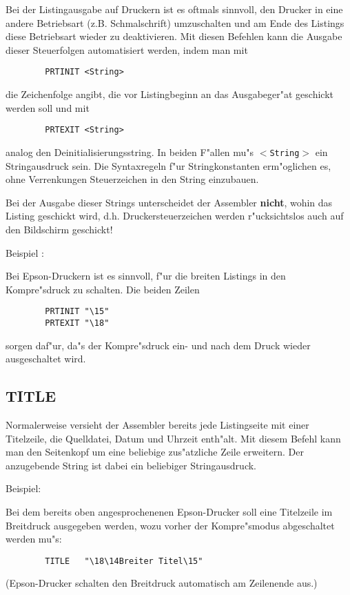 \documentclass[12pt,a4paper,twoside]{report}
\makeatletter
\newcommand{\bb}[1]{{\bf #1}}
\newcommand{\tty}[1]{{\tt #1}}
\newcommand{\ttindex}[1]{\index{#1@{\tt #1}}}
\makeatother
\begin{document}
{Bei der Listingausgabe auf Druckern ist es oftmals sinnvoll, den
Drucker in eine andere Betriebsart (z.B. Schmalschrift) umzuschalten
und am Ende des Listings diese Betriebsart wieder zu deaktivieren. Mit
diesen Befehlen kann die Ausgabe dieser Steuerfolgen automatisiert
werden, indem man mit
\begin{verbatim}
        PRTINIT <String>
\end{verbatim}
die Zeichenfolge angibt, die vor Listingbeginn an das Ausgabeger"at
geschickt werden soll und mit
\begin{verbatim}
        PRTEXIT <String>
\end{verbatim}
analog den Deinitialisierungsstring.  In beiden F"allen mu"s
\tty{$<$String$>$} ein Stringausdruck sein.  Die Syntaxregeln f"ur
Stringkonstanten erm"oglichen es, ohne Verrenkungen Steuerzeichen in den
String einzubauen.
\par
Bei der Ausgabe dieser Strings unterscheidet der Assembler \bb{nicht},
wohin das Listing geschickt wird, d.h. Druckersteuerzeichen werden
r"ucksichtslos auch auf den Bildschirm geschickt!
\par
Beispiel :
\par
Bei Epson-Druckern ist es sinnvoll, f"ur die breiten Listings
in den Kompre"sdruck zu schalten.  Die beiden Zeilen
\begin{verbatim}
        PRTINIT "\15"
        PRTEXIT "\18"
\end{verbatim}
sorgen daf"ur, da"s der Kompre"sdruck ein- und nach dem Druck wieder
ausgeschaltet wird.


\subsection{TITLE}
\ttindex{TITLE}

Normalerweise versieht der Assembler bereits jede Listingseite mit
einer Titelzeile, die Quelldatei, Datum und Uhrzeit enth"alt.  Mit
diesem Befehl kann man den Seitenkopf um eine beliebige zus"atzliche
Zeile erweitern.  Der anzugebende String ist dabei ein beliebiger
Stringausdruck.
\par
Beispiel:
\par
Bei dem bereits oben angesprochenenen Epson-Drucker soll eine Titelzeile
im Breitdruck ausgegeben werden, wozu vorher der Kompre"smodus
abgeschaltet werden mu"s:
\begin{verbatim}
        TITLE   "\18\14Breiter Titel\15"
\end{verbatim}
(Epson-Drucker schalten den Breitdruck automatisch am Zeilenende aus.)

}
\end{document}

